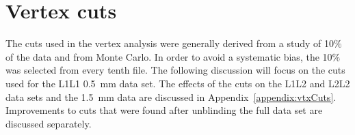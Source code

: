 
\section{Vertex cuts}
The cuts used in the vertex analysis were generally derived from a study of 10$\%$ of the data and from Monte Carlo. In order to avoid a systematic bias, the 10$\%$ was selected from every tenth file. The following discussion will focus on the cuts used for the L1L1 0.5~mm data set. The effects of the cuts on the L1L2 and L2L2 data sets and the 1.5~mm data are discussed in Appendix~\ref{appendix:vtxCuts}. Improvements to cuts that were found after unblinding the full data set are discussed separately.\\ 

